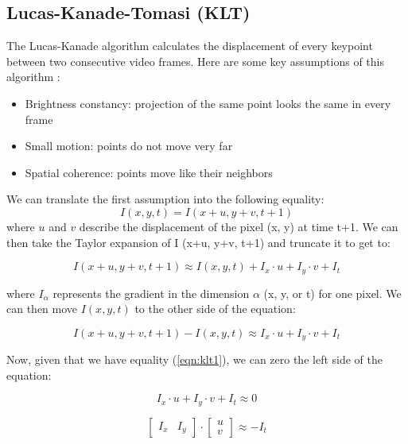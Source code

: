 \documentclass[]{IEEEtran}
\begin{document}
\subsection{Lucas-Kanade-Tomasi (KLT)}
The Lucas-Kanade algorithm calculates the displacement of every keypoint between two consecutive video frames. Here are some key assumptions of this algorithm \cite{illinois_cv}:
\begin{itemize}
\item Brightness constancy: projection of the same point looks the same in every frame
\item Small motion: points do not move very far
\item Spatial coherence: points move like their neighbors
\end{itemize}

We can translate the first assumption into the following equality:
\begin{equation}\label{eqn:klt1}
    I(x, y, t) = I(x+u, y+v, t+1)
\end{equation}
where $u$ and $v$ describe the displacement of the pixel (x, y) at time t+1. We can then take the Taylor expansion of I (x+u, y+v, t+1) and truncate it to get to:

\begin{equation}\label{eqn:klt2}
    I(x+u, y+v, t+1) \approx I(x, y, t) + I_x \cdot u + I_y \cdot v + I_t
\end{equation}

where $I_\alpha$ represents the gradient in the dimension $\alpha$ (x, y, or t) for one pixel.
We can then move $I(x, y, t)$ to the other side of the equation:

\begin{equation}\label{eqn:klt3}
    I(x+u, y+v, t+1) - I(x, y, t) \approx I_x \cdot u + I_y \cdot v + I_t
\end{equation}

Now, given that we have equality (\ref{eqn:klt1}), we can zero the left side of the equation:

\begin{equation}\label{eqn:klt4}
    I_x \cdot u + I_y \cdot v + I_t \approx 0
\end{equation}

\begin{equation}\label{eqn:klt5}
    \begin{bmatrix}
    I_x & I_y
    \end{bmatrix}
    \cdot
    \begin{bmatrix}
    u \\ v
    \end{bmatrix}
    \approx -I_t
\end{equation}
\end{document}
